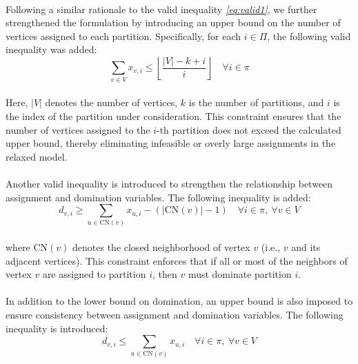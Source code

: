 \paragraph{} Following a similar rationale to the valid inequality \textsl{\eqref{eq:valid1}}, we further strengthened the formulation by introducing an upper bound on the number of vertices assigned to each partition. Specifically, for each $i \in \Pi$, the following valid inequality was added:
\begin{equation}
    \sum_{v \in V} x_{v,i} \leq \left\lfloor \frac{|V| - k + i}{i} \right\rfloor \quad \forall i \in \pi \label{eq:valid2}
\end{equation}

\paragraph{} Here, $|V|$ denotes the number of vertices, $k$ is the number of partitions, and $i$ is the index of the partition under consideration. This constraint ensures that the number of vertices assigned to the $i$-th partition does not exceed the calculated upper bound, thereby eliminating infeasible or overly large assignments in the relaxed model.

\paragraph{} Another valid inequality is introduced to strengthen the relationship between assignment and domination variables. The following inequality is added:
\begin{equation}
    d_{v,i} \geq \sum_{u \in \text{CN}(v)} x_{u,i} - \left( |\text{CN}(v)| - 1 \right) \quad \forall i \in \pi,\ \forall v \in V
\end{equation}

\paragraph{} where $\text{CN}(v)$ denotes the closed neighborhood of vertex $v$ (i.e., $v$ and its adjacent vertices). This constraint enforces that if all or most of the neighbors of vertex $v$ are assigned to partition $i$, then $v$ must dominate partition $i$.

\paragraph{} In addition to the lower bound on domination, an upper bound is also imposed to ensure consistency between assignment and domination variables. The following inequality is introduced:
\begin{equation}
    d_{v,i} \leq \sum_{u \in \text{CN}(v)} x_{u,i}  \quad \forall i \in \pi,\ \forall v \in V
\end{equation}

